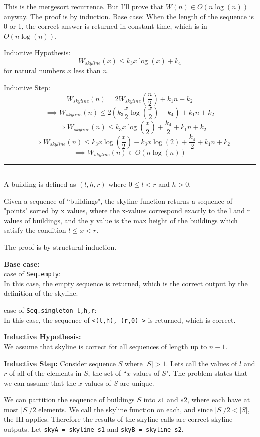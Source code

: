 \documentclass[11pt,letterpaper]{article}
\newcommand{\question}[2] {\vspace{.25in} \hrule\vspace{0.5em}
\noindent{\bf #1: #2} \vspace{0.5em}
\hrule \vspace{.10in}}
\begin{document}
This is the mergesort recurrence. But I'll prove that $W(n) \in O(n \log( n))$ anyway.
The proof is by induction. Base case: When the length of the sequence is 0 or 1,
the correct answer is returned in constant time, which is in $O(n \log( n))$.

Inductive Hypothesis: \\
$$W_{skyline}(x) \leq k_3 x \log(x) + k_4$$ for natural numbers $x$ less than $n$.

Inductive Step:
$$W_{skyline}(n)= 2 W_{skyline}(\frac{n}{2}) + k_1 n + k_2$$
$$\implies W_{skyline}(n) \leq 2 (k_3 \frac{x}{2} \log(\frac{x}{2}) + k_4) + k_1 n + k_2$$
$$\implies W_{skyline}(n) \leq k_3 x \log(\frac{x}{2}) + \frac{k_4}{2} + k_1 n + k_2$$
$$\implies W_{skyline}(n) \leq k_3 x \log(\frac{x}{2}) - k_3 x \log(2) + \frac{k_4}{2} + k_1 n + k_2$$
$$\implies W_{skyline}(n) \in O(n \log(n))$$








\question{3}{Task 5.3}
A building is defined as $(l,h,r)$ where $0 \leq l < r$ and $h > 0$.

Given a sequence of ``buildings", the skyline function returns a sequence of
"points" sorted by x values, where the x-values correspond exactly to the 
l and r values of buildings, and the y value is the max height of the buildings
which satisfy the condition $l \leq x < r$.

The proof is by structural induction.

\textbf{Base case:}\\
case of \texttt{Seq.empty}: \\
In this case, the empty sequence is returned, which is the correct output
by the definition of the skyline.

case of \texttt{Seq.singleton l,h,r}: \\
In this case, the sequence of \texttt{\textless (l,h), (r,0) \textgreater} is returned, which is correct.

\textbf{Inductive Hypothesis:} \\
We assume that skyline is correct for all sequences of length up to $n-1$.

\textbf{Inductive Step:}
Consider sequence $S$ where $|S| > 1$. Lets call the values of $l$ and $r$
of all of the elements in $S$, the set of ``$x$ values of $S$". The problem 
states that we can assume that the $x$ values of $S$ are unique.

We can partition the sequence of buildings $S$ into $s1$ and $s2$,
where each have at most $|S|/2$ elements.
We call the skyline function on each, and since $|S|/2 < |S|$, the IH applies.
Therefore the results of the skyline calls are correct skyline outputs.
Let \texttt{skyA = skyline s1} and \texttt{skyB = skyline s2}.
\end{document}
